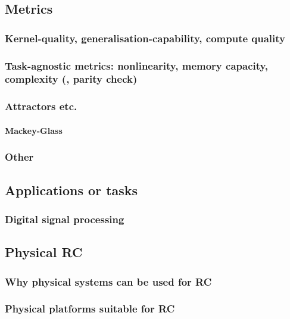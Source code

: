\subsection{Metrics}
\subsubsection{Kernel-quality, generalisation-capability, compute quality}
\subsubsection{Task-agnostic metrics: nonlinearity, memory capacity, complexity (, parity check)}
\subsubsection{Attractors etc.} %
\paragraph{Mackey-Glass}
\subsubsection{Other} %
\subsection{Applications or tasks}
\subsubsection{Digital signal processing} %
\subsection{Physical RC}
\subsubsection{Why physical systems can be used for RC}
\subsubsection{Physical platforms suitable for RC}
